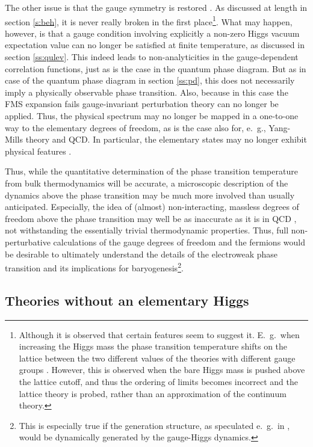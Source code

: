\documentclass[final,twoside,12pt]{article}
\newcommand*{\1}{1\!\!\!\bot}
\begin{document}
The other issue is that the gauge symmetry is restored \cite{Kapusta:2006pm}. As discussed at length in section \ref{s:beh}, it is never really broken in the first place\footnote{Although it is observed that certain features seem to suggest it. E.\ g.\ when increasing the Higgs mass the phase transition temperature shifts on the lattice between the two different values of the theories with different gauge groups \cite{Brower:1982yn,Kikugawa:1985ex,Wellegehausen:2011sc}. However, this is observed when the bare Higgs mass is pushed above the lattice cutoff, and thus the ordering of limits becomes incorrect and the lattice theory is probed, rather than an approximation of the continuum theory.}. What may happen, however, is that a gauge condition involving explicitly a non-zero Higgs vacuum expectation value can no longer be satisfied at finite temperature, as discussed in section \ref{ss:qulev}. This indeed leads to non-analyticities in the gauge-dependent correlation functions, just as is the case in the quantum phase diagram. But as in case of the quantum phase diagram in section \ref{ss:pd}, this does not necessarily imply a physically observable phase transition. Also, because in this case the FMS expansion fails gauge-invariant perturbation theory can no longer be applied. Thus, the physical spectrum may no longer be mapped in a one-to-one way to the elementary degrees of freedom, as is the case also for, e.\ g., Yang-Mills theory and QCD. In particular, the elementary states may no longer exhibit physical features \cite{Maas:2011se}.

Thus, while the quantitative determination of the phase transition temperature from bulk thermodynamics will be accurate, a microscopic description of the dynamics above the phase transition may be much more involved than usually anticipated. Especially, the idea of (almost) non-interacting, massless degrees of freedom above the phase transition may well be as inaccurate as it is in QCD \cite{Maas:2011se}, not withstanding the essentially trivial thermodynamic properties. Thus, full non-perturbative calculations of the gauge degrees of freedom and the fermions would be desirable to ultimately understand the details of the electroweak phase transition and its implications for baryogenesis\footnote{This is especially true if the generation structure, as speculated e.\ g.\ in \cite{Egger:2017tkd}, would be dynamically generated by the gauge-Higgs dynamics.}.

\subsection{Theories without an elementary Higgs}\label{ss:tc}
\end{document}
